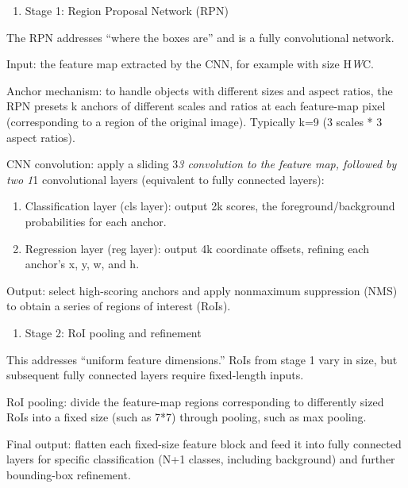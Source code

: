 \begin{enumerate}
\def\labelenumi{\arabic{enumi}.}
\tightlist
\item
  Stage 1: Region Proposal Network (RPN)
\end{enumerate}

The RPN addresses ``where the boxes are'' and is a fully convolutional network.

Input: the feature map extracted by the CNN, for example with size H\emph{W}C.

Anchor mechanism: to handle objects with different sizes and aspect ratios, the RPN presets k anchors of different scales and ratios at each feature-map pixel (corresponding to a region of the original image). Typically k=9 (3 scales * 3 aspect ratios).

CNN convolution: apply a sliding 3\emph{3 convolution to the feature map, followed by two 1}1 convolutional layers (equivalent to fully connected layers):

\begin{enumerate}
\def\labelenumi{(\arabic{enumi})}
\item
  Classification layer (cls layer): output 2k scores, the foreground/background probabilities for each anchor.
\item
  Regression layer (reg layer): output 4k coordinate offsets, refining each anchor's x, y, w, and h.
\end{enumerate}

Output: select high-scoring anchors and apply nonmaximum suppression (NMS) to obtain a series of regions of interest (RoIs).

\begin{enumerate}
\def\labelenumi{\arabic{enumi}.}
\setcounter{enumi}{1}
\tightlist
\item
  Stage 2: RoI pooling and refinement
\end{enumerate}

This addresses ``uniform feature dimensions.'' RoIs from stage 1 vary in size, but subsequent fully connected layers require fixed-length inputs.

RoI pooling: divide the feature-map regions corresponding to differently sized RoIs into a fixed size (such as 7*7) through pooling, such as max pooling.

Final output: flatten each fixed-size feature block and feed it into fully connected layers for specific classification (N+1 classes, including background) and further bounding-box refinement.

